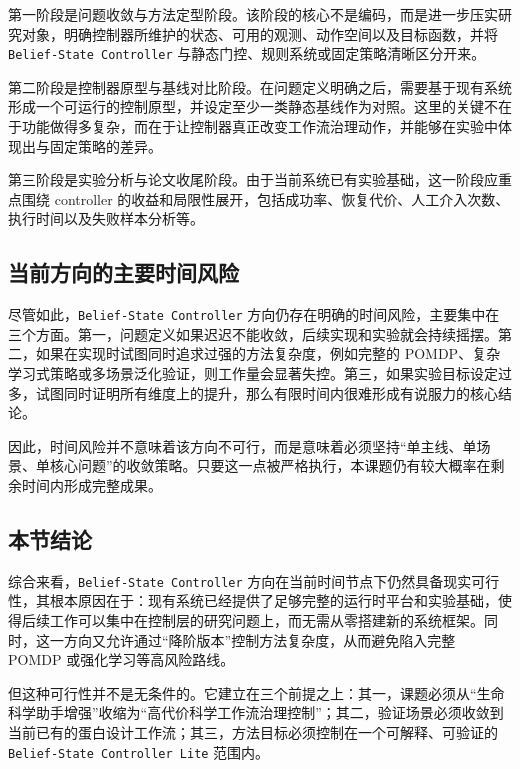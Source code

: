 第一阶段是问题收敛与方法定型阶段。该阶段的核心不是编码，而是进一步压实研究对象，明确控制器所维护的状态、可用的观测、动作空间以及目标函数，并将 \texttt{Belief-State Controller} 与静态门控、规则系统或固定策略清晰区分开来。

第二阶段是控制器原型与基线对比阶段。在问题定义明确之后，需要基于现有系统形成一个可运行的控制原型，并设定至少一类静态基线作为对照。这里的关键不在于功能做得多复杂，而在于让控制器真正改变工作流治理动作，并能够在实验中体现出与固定策略的差异。

第三阶段是实验分析与论文收尾阶段。由于当前系统已有实验基础，这一阶段应重点围绕 controller 的收益和局限性展开，包括成功率、恢复代价、人工介入次数、执行时间以及失败样本分析等。

\subsection{当前方向的主要时间风险}

尽管如此，\texttt{Belief-State Controller} 方向仍存在明确的时间风险，主要集中在三个方面。第一，问题定义如果迟迟不能收敛，后续实现和实验就会持续摇摆。第二，如果在实现时试图同时追求过强的方法复杂度，例如完整的 POMDP、复杂学习式策略或多场景泛化验证，则工作量会显著失控。第三，如果实验目标设定过多，试图同时证明所有维度上的提升，那么有限时间内很难形成有说服力的核心结论。

因此，时间风险并不意味着该方向不可行，而是意味着必须坚持“单主线、单场景、单核心问题”的收敛策略。只要这一点被严格执行，本课题仍有较大概率在剩余时间内形成完整成果。

\subsection{本节结论}

综合来看，\texttt{Belief-State Controller} 方向在当前时间节点下仍然具备现实可行性，其根本原因在于：现有系统已经提供了足够完整的运行时平台和实验基础，使得后续工作可以集中在控制层的研究问题上，而无需从零搭建新的系统框架。同时，这一方向又允许通过“降阶版本”控制方法复杂度，从而避免陷入完整 POMDP 或强化学习等高风险路线。

但这种可行性并不是无条件的。它建立在三个前提之上：其一，课题必须从“生命科学助手增强”收缩为“高代价科学工作流治理控制”；其二，验证场景必须收敛到当前已有的蛋白设计工作流；其三，方法目标必须控制在一个可解释、可验证的 \texttt{Belief-State Controller Lite} 范围内。
